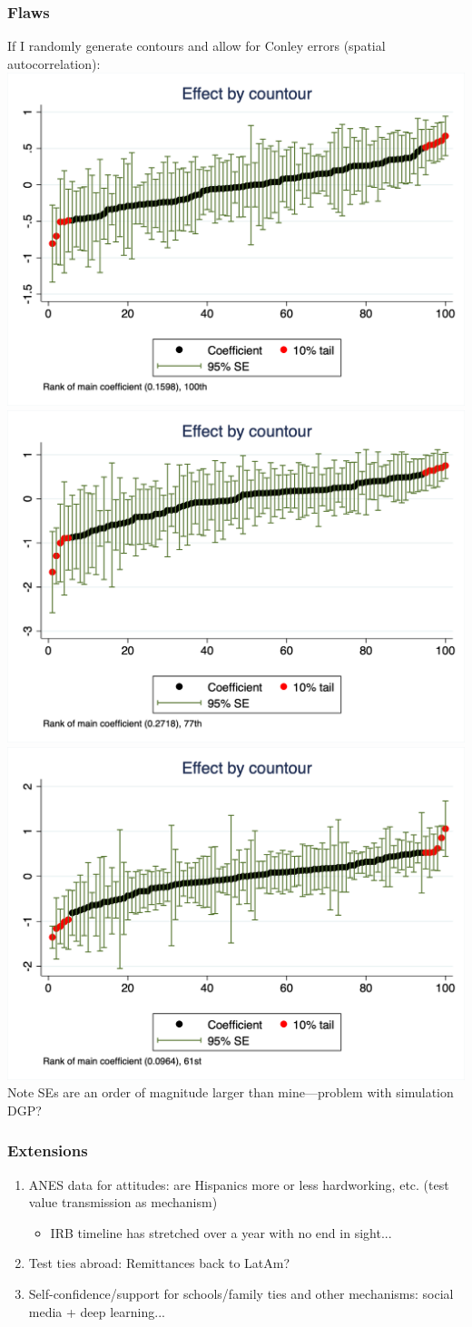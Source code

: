 \documentclass{beamer}
\begin{document}
\begin{frame}
\frametitle{Flaws}
If I randomly generate contours and allow for Conley errors (spatial autocorrelation):\\
\includegraphics[width=.4\textwidth]{../../analysis/Output/graphs/placebo_contour_coeffs_satact.png} 
\includegraphics[width=.4\textwidth]{../../analysis/Output/graphs/placebo_contour_coeffs_calc.png}\\
\includegraphics[width=.4\textwidth]{../../analysis/Output/graphs/placebo_contour_coeffs_app.png}\\
Note SEs are an order of magnitude larger than mine---problem with simulation DGP?
\end{frame}

\begin{frame}
\frametitle{Extensions}
\begin{enumerate}
\item ANES data for attitudes: are Hispanics more or less hardworking, etc. (test value transmission as mechanism)
\begin{itemize}
\item IRB timeline has stretched over a year with no end in sight...
\end{itemize}

\item Test ties abroad: Remittances back to LatAm?
\item Self-confidence/support for schools/family ties and other mechanisms: social media + deep learning...

\end{enumerate}

\end{frame}
\end{document}

